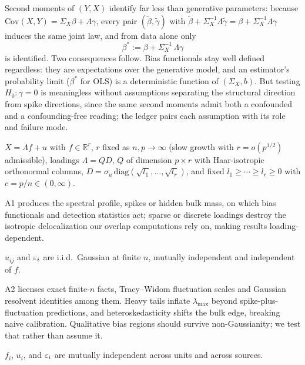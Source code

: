 Second moments of $(Y,X)$ identify far less than generative parameters: because $\mathrm{Cov}(X,Y) = \Sigma_X\beta + \Lambda\gamma$, every pair $(\tilde\beta, \tilde\gamma)$ with $\tilde\beta + \Sigma_X^{-1}\Lambda\tilde\gamma = \beta + \Sigma_X^{-1}\Lambda\gamma$ induces the same joint law, and from data alone only
\[
\beta^* := \beta + \Sigma_X^{-1}\,\Lambda\gamma
\]
is identified. Two consequences follow. Bias functionals stay well defined regardless: they are expectations over the generative model, and an estimator's probability limit ($\beta^*$ for OLS) is a deterministic function of $(\Sigma_X, b)$. But testing $H_0\colon \gamma = 0$ is meaningless without assumptions separating the structural direction from spike directions, since the same second moments admit both a confounded and a confounding-free reading; the ledger pairs each assumption with its role and failure mode.

\begin{assumption}
\label{assump:A1}
$X = \Lambda f + u$ with $f \in \mathbb{R}^r$, $r$ fixed as $n, p \to \infty$ (slow growth with $r = o(p^{1/2})$ admissible), loadings $\Lambda = QD$, $Q$ of dimension $p \times r$ with Haar-isotropic orthonormal columns, $D = \sigma_u\,\mathrm{diag}(\sqrt{l_1}, \dots, \sqrt{l_r})$, and fixed $l_1 \ge \cdots \ge l_r \ge 0$ with $c = p/n \in (0,\infty)$.
\end{assumption}

A1 produces the spectral profile, spikes or hidden bulk mass, on which bias functionals and detection statistics act; sparse or discrete loadings destroy the isotropic delocalization our overlap computations rely on, making results loading-dependent.

\begin{assumption}
\label{assump:A2}
$u_{ij}$ and $\varepsilon_i$ are i.i.d.\ Gaussian at finite $n$, mutually independent and independent of $f$.
\end{assumption}

A2 licenses exact finite-$n$ facts, Tracy--Widom fluctuation scales and Gaussian resolvent identities among them. Heavy tails inflate $\lambda_{\max}$ beyond spike-plus-fluctuation predictions, and heteroskedasticity shifts the bulk edge, breaking naive calibration. Qualitative bias regions should survive non-Gaussianity; we test that rather than assume it.

\begin{assumption}
\label{assump:A3}
$f_i$, $u_i$, and $\varepsilon_i$ are mutually independent across units and across sources.
\end{assumption}

